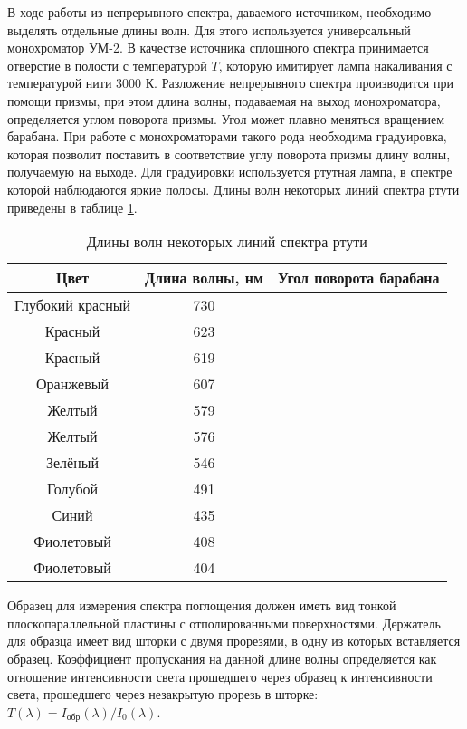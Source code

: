 В ходе работы из непрерывного спектра, даваемого источником, необходимо выделять отдельные длины волн. Для этого используется универсальный монохроматор УМ-2. В качестве источника сплошного спектра принимается отверстие в полости с температурой $T$, которую имитирует лампа накаливания с температурой нити 3000 К. Разложение непрерывного спектра производится при помощи призмы, при этом длина волны, подаваемая на выход монохроматора, определяется углом поворота призмы. Угол может плавно меняться вращением барабана. При работе с монохроматорами такого рода необходима градуировка, которая позволит поставить в соответствие углу поворота призмы длину волны, получаемую на выходе. Для градуировки используется ртутная лампа, в спектре которой наблюдаются яркие полосы. Длины волн некоторых линий спектра ртути приведены в таблице \ref{table6_Hg}.

\begin{table}[h!]
\caption{Длины волн некоторых линий спектра ртути}
\begin{center}
\begin{tabular}{c|c|c}
Цвет & Длина волны, нм & Угол поворота барабана \\
\hline
Глубокий красный & 730 & \\
Красный & 623 & \\
Красный & 619 & \\
Оранжевый & 607 & \\
Желтый & 579 & \\
Желтый & 576 & \\
Зелёный & 546 & \\
Голубой & 491 & \\
Синий & 435 & \\
Фиолетовый & 408 & \\
Фиолетовый & 404 & \\
\hline
\end{tabular}
\end{center}
\label{table6_Hg}
\end{table}

Образец для измерения спектра поглощения должен иметь вид тонкой плоскопараллельной пластины с отполированными поверхностями. Держатель для образца имеет вид шторки с двумя прорезями, в одну из которых вставляется образец. Коэффициент пропускания на данной длине волны определяется как отношение интенсивности света прошедшего через образец к интенсивности света, прошедшего через незакрытую прорезь в шторке: $T(\lambda) = I_{\text{обр}}(\lambda)/I_{\text{0}}(\lambda)$.

